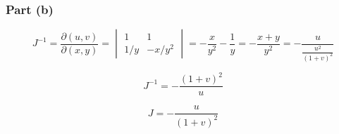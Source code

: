 \documentclass[12pt]{article}
\begin{document}
\subsubsection{Part (b)}

\[
    J^{-1} = \frac{\partial(u, v)}{\partial(x, y)} = \begin{vmatrix}
        1   & 1      \\
        1/y & -x/y^2
    \end{vmatrix} = - \frac{x}{y^2} - \frac{1}{y} = -\frac{x + y}{y^2} = -\frac{u}{\frac{u^2}{{(1+v)}^2}}
\]

\[
    J^{-1}  = -\frac{{(1+v)}^2}{u}
\]

\[
    J = -\frac{u}{{(1+v)}^2}
\]

\newpage


\nocite{arfken2013mathematical}
\nocite{El-Deeb_PEU-356_Assignments}
\end{document}
